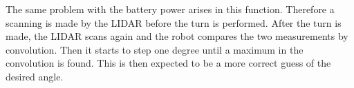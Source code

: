 The same problem with the battery power arises in this function. Therefore a scanning is made by the LIDAR before the turn is performed. After the turn is made, the LIDAR scans again and the robot compares the two measurements by convolution. Then it starts to step one degree until a maximum in the convolution is found. This is then expected to be a more correct guess of the desired angle.
